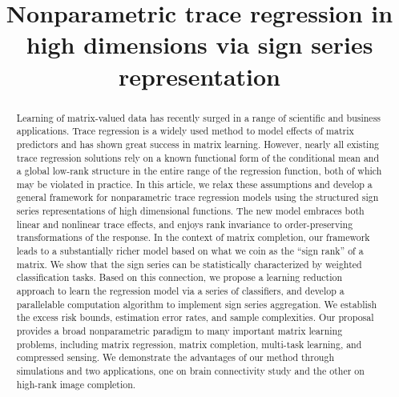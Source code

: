 \documentclass[aos]{imsart}
\theoremstyle{definition}
\begin{document}
\begin{frontmatter}
\title{Nonparametric trace regression in high dimensions via sign series representation}




\begin{abstract}
Learning of matrix-valued data has recently surged in a range of scientific and business applications. Trace regression is a widely used method to model effects of matrix predictors and has shown great success in matrix learning. However, nearly all existing trace regression solutions rely on a known functional form of the conditional mean and a global low-rank structure in the entire range of the regression function, both of which may be violated in practice. In this article, we relax these assumptions and develop a general framework for nonparametric trace regression models using the structured sign series representations of high dimensional functions. The new model embraces both linear and nonlinear trace effects, and enjoys rank invariance to order-preserving transformations of the response. In the context of matrix completion, our framework leads to a substantially richer model based on what we coin as the ``sign rank'' of a matrix. We show that the sign series can be statistically characterized by weighted classification tasks. Based on this connection, we propose a learning reduction approach to learn the regression model via a series of classifiers, and develop a parallelable computation algorithm to implement sign series aggregation. We establish the excess risk bounds, estimation error rates, and sample complexities. Our proposal provides a broad nonparametric paradigm to many important matrix learning problems, including matrix regression, matrix completion, multi-task learning, and compressed sensing. We demonstrate the advantages of our method through simulations and two applications, one on brain connectivity study and the other on high-rank image completion. 
\end{abstract}


\begin{keyword}[class=MSC2020]
\end{keyword}
\begin{keyword}
\end{keyword}

\end{frontmatter}
\end{document}
